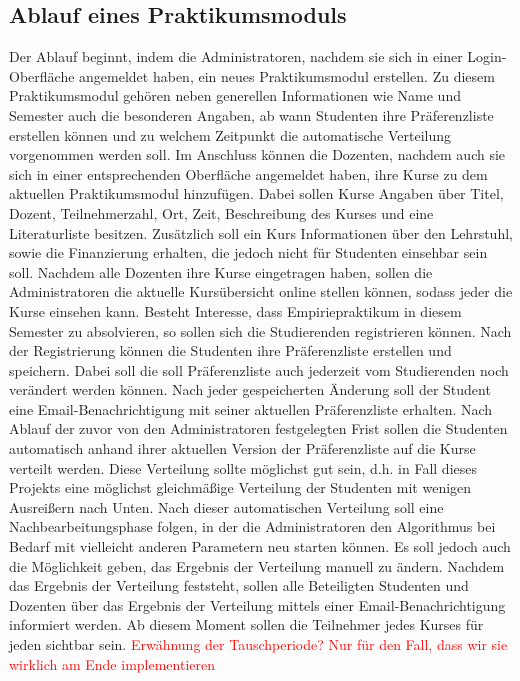         \subsection{Ablauf eines Praktikumsmoduls}
            Der Ablauf beginnt, indem die Administratoren, nachdem sie sich in einer Login-Oberfläche angemeldet haben, ein neues Praktikumsmodul erstellen.
            Zu diesem Praktikumsmodul gehören neben generellen Informationen wie Name und Semester auch die besonderen Angaben, ab wann Studenten ihre Präferenzliste erstellen können und zu welchem Zeitpunkt die automatische Verteilung vorgenommen werden soll.
            Im Anschluss können die Dozenten, nachdem auch sie sich in einer entsprechenden Oberfläche angemeldet haben, ihre Kurse zu dem aktuellen Praktikumsmodul hinzufügen.
            Dabei sollen Kurse Angaben über Titel, Dozent, Teilnehmerzahl, Ort, Zeit, Beschreibung des Kurses und eine Literaturliste besitzen.
            Zusätzlich soll ein Kurs Informationen über den Lehrstuhl, sowie die Finanzierung erhalten, die jedoch nicht für Studenten einsehbar sein soll.
            Nachdem alle Dozenten ihre Kurse eingetragen haben, sollen die Administratoren die aktuelle Kursübersicht online stellen können, sodass jeder die Kurse einsehen kann.
            Besteht Interesse, dass Empiriepraktikum in diesem Semester zu absolvieren, so sollen sich die Studierenden registrieren können.
            Nach der Registrierung können die Studenten ihre Präferenzliste erstellen und speichern.
            Dabei soll die soll Präferenzliste auch jederzeit vom Studierenden noch verändert werden können.
            Nach jeder gespeicherten Änderung soll der Student eine Email-Benachrichtigung mit seiner aktuellen Präferenzliste erhalten.
            Nach Ablauf der zuvor von den Administratoren festgelegten Frist sollen die Studenten automatisch anhand ihrer aktuellen Version der Präferenzliste auf die Kurse verteilt werden.
            Diese Verteilung sollte möglichst gut sein, d.h. in Fall dieses Projekts eine möglichst gleichmäßige Verteilung der Studenten mit wenigen Ausreißern nach Unten.
            Nach dieser automatischen Verteilung soll eine Nachbearbeitungsphase folgen, in der die Administratoren den Algorithmus bei Bedarf mit vielleicht anderen Parametern neu starten können.
            Es soll jedoch auch die Möglichkeit geben, das Ergebnis der Verteilung manuell zu ändern.
            Nachdem das Ergebnis der Verteilung feststeht, sollen alle Beteiligten Studenten und Dozenten über das Ergebnis der Verteilung mittels einer Email-Benachrichtigung informiert werden.
            Ab diesem Moment sollen die Teilnehmer jedes Kurses für jeden sichtbar sein.
            \textcolor{red}{Erwähnung der Tauschperiode? Nur für den Fall, dass wir sie wirklich am Ende implementieren}
            
